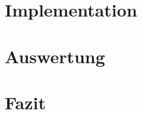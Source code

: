 \documentclass[12pt,a4paper]{scrartcl}
\begin{document}
\section{Implementation}\label{impl}

\section{Auswertung}\label{erg}

\section{Fazit}\label{fazit}
\end{document}
